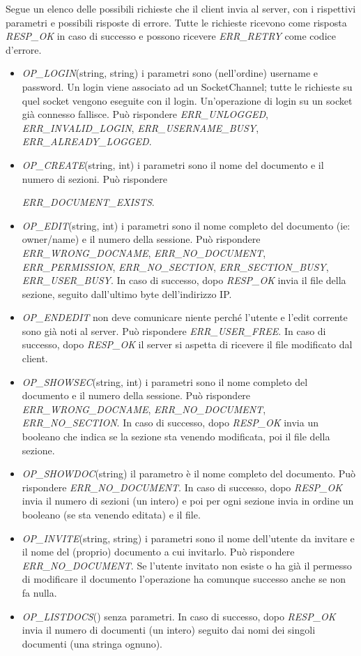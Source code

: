 \documentclass[a4paper]{article}
\theoremstyle{theorem}
\theoremstyle{remark}
\theoremstyle{definition}
\theoremstyle{corollary}
\theoremstyle{lemma}
\begin{document}
Segue un elenco delle possibili richieste che il client invia al server, con i rispettivi parametri e possibili risposte di errore. Tutte le richieste ricevono come risposta \textit{RESP\_OK} in caso di successo e possono ricevere \textit{ERR\_RETRY} come codice d'errore.
\begin{itemize}
	\item \textit{OP\_LOGIN}(string, string) i parametri sono (nell'ordine) username e password. Un login viene associato ad un SocketChannel; tutte le richieste su quel socket vengono eseguite con il login. Un'operazione di login su un socket già connesso fallisce. Può rispondere \textit{ERR\_UNLOGGED}, \textit{ERR\_INVALID\_LOGIN}, \textit{ERR\_USERNAME\_BUSY}, \textit{ERR\_ALREADY\_LOGGED}.
	\item \textit{OP\_CREATE}(string, int) i parametri sono il nome del documento e il numero di sezioni. Può rispondere
	
	\textit{ERR\_DOCUMENT\_EXISTS}.
	\item \textit{OP\_EDIT}(string, int) i parametri sono il nome completo del documento (ie: owner/name) e il numero della sessione. Può rispondere \textit{ERR\_WRONG\_DOCNAME}, \textit{ERR\_NO\_DOCUMENT}, \textit{ERR\_PERMISSION}, \textit{ERR\_NO\_SECTION}, \textit{ERR\_SECTION\_BUSY}, \textit{ERR\_USER\_BUSY}. In caso di successo, dopo \textit{RESP\_OK} invia il file della sezione, seguito dall'ultimo byte dell'indirizzo IP.
	\item \textit{OP\_ENDEDIT} non deve comunicare niente perché l'utente e l'edit corrente sono già noti al server. Può rispondere \textit{ERR\_USER\_FREE}. In caso di successo, dopo \textit{RESP\_OK} il server si aspetta di ricevere il file modificato dal client.
	\item \textit{OP\_SHOWSEC}(string, int) i parametri sono il nome completo del documento e il numero della sessione. Può rispondere \textit{ERR\_WRONG\_DOCNAME}, \textit{ERR\_NO\_DOCUMENT}, \textit{ERR\_NO\_SECTION}. In caso di successo, dopo \textit{RESP\_OK} invia un booleano che indica se la sezione sta venendo modificata, poi il file della sezione.
	\item \textit{OP\_SHOWDOC}(string) il parametro è il nome completo del documento. Può rispondere \textit{ERR\_NO\_DOCUMENT}. In caso di successo, dopo \textit{RESP\_OK} invia il numero di sezioni (un intero) e poi per ogni sezione invia in ordine un booleano (se sta venendo editata) e il file.
	\item \textit{OP\_INVITE}(string, string) i parametri sono il nome dell'utente da invitare e il nome del (proprio) documento a cui invitarlo. Può rispondere \textit{ERR\_NO\_DOCUMENT}. Se l'utente invitato non esiste o ha già il permesso di modificare il documento l'operazione ha comunque successo anche se non fa nulla.
	\item \textit{OP\_LISTDOCS}() senza parametri. In caso di successo, dopo \textit{RESP\_OK} invia il numero di documenti (un intero) seguito dai nomi dei singoli documenti (una stringa ognuno).
\end{itemize}
\end{document}
